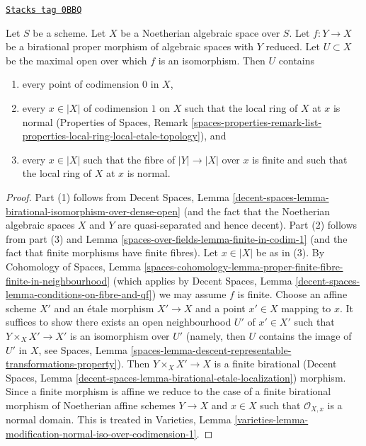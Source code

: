\begin{lemma}
\label{spaces-over-fields-lemma-modification-normal-iso-over-codimension-1}
\href{https://stacks.math.columbia.edu/tag/0BBQ}{\texttt{Stacks tag 0BBQ}}

Let $S$ be a scheme. Let $X$ be a Noetherian algebraic space over $S$.
Let $f : Y \to X$ be a birational proper morphism of algebraic spaces
with $Y$ reduced.
Let $U \subset X$ be the maximal open over which $f$ is an isomorphism.
Then $U$ contains
\begin{enumerate}
\item every point of codimension $0$ in $X$,
\item every $x \in |X|$ of codimension $1$ on $X$ such that the local ring of
$X$ at $x$ is normal (Properties of Spaces, Remark
\ref{spaces-properties-remark-list-properties-local-ring-local-etale-topology}),
and
\item every $x \in |X|$ such that the fibre of $|Y| \to |X|$ over $x$ is
finite and such that the local ring of $X$ at $x$ is normal.
\end{enumerate}
\end{lemma}

\begin{proof}
Part (1) follows from Decent Spaces, Lemma
\ref{decent-spaces-lemma-birational-isomorphism-over-dense-open}
(and the fact that the Noetherian algebraic spaces $X$ and $Y$
are quasi-separated and hence decent).
Part (2) follows from part (3) and Lemma \ref{spaces-over-fields-lemma-finite-in-codim-1}
(and the fact that finite morphisms have finite fibres).
Let $x \in |X|$ be as in (3). By
Cohomology of Spaces, Lemma
\ref{spaces-cohomology-lemma-proper-finite-fibre-finite-in-neighbourhood}
(which applies by Decent Spaces, Lemma
\ref{decent-spaces-lemma-conditions-on-fibre-and-qf})
we may assume $f$ is finite. Choose an affine scheme $X'$ and
an \'etale morphism $X' \to X$ and a point $x' \in X$ mapping to $x$.
It suffices to show there exists an open neighbourhood $U'$ of $x' \in X'$
such that $Y \times_X X' \to X'$ is an isomorphism over $U'$
(namely, then $U$ contains the image of $U'$ in $X$, see Spaces, Lemma
\ref{spaces-lemma-descent-representable-transformations-property}).
Then $Y \times_X X' \to X$ is a finite birational
(Decent Spaces, Lemma \ref{decent-spaces-lemma-birational-etale-localization})
morphism. Since a finite morphism is affine we reduce to
the case of a finite birational morphism of Noetherian affine schemes
$Y \to X$ and $x \in X$ such that $\mathcal{O}_{X, x}$ is a
normal domain. This is treated in Varieties, Lemma
\ref{varieties-lemma-modification-normal-iso-over-codimension-1}.
\end{proof}

